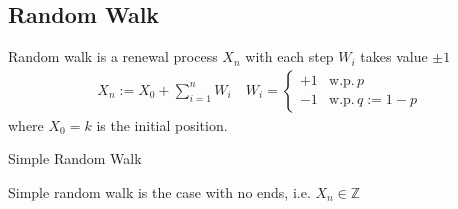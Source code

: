 \subsection{Random Walk}
\hypertarget{RandomWalk}{}

Random walk is a renewal process $ X_n $ with each step $ W_i $ takes value $ \pm 1 $
\begin{align}
    X_n := X_0 +\sum_{i=1}^nW_i\quad W_i=\begin{cases}
        +1&\mathrm{w.p.}\, p\\
        -1&\mathrm{w.p.}\, q:=1-p  
    \end{cases}
\end{align}
where $ X_0=k $ is the initial position.

\begin{point}
    Simple Random Walk
\end{point}

Simple random walk is the case with no ends, i.e. $ X_n\in \mathbb{Z} $


